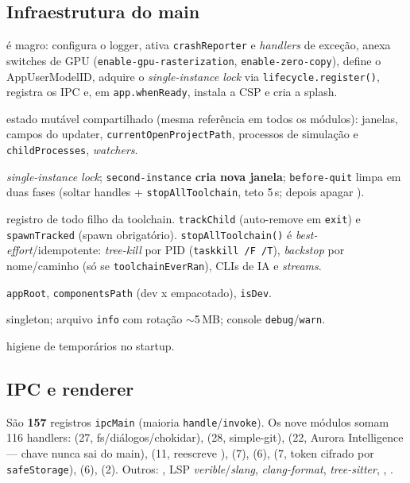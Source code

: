 \subsection{Infraestrutura do main}
 é magro: configura o logger, ativa \lstinline|crashReporter| e \emph{handlers} de exceção, anexa switches de GPU (\lstinline|enable-gpu-rasterization|, \lstinline|enable-zero-copy|), define o AppUserModelID, adquire o \emph{single-instance lock} via \lstinline|lifecycle.register()|, registra os IPC e, em \lstinline|app.whenReady|, instala a CSP e cria a splash.

\begin{description}[leftmargin=*]
  \item[\file{state.js}] estado mutável compartilhado (mesma referência em todos os módulos): janelas, campos do updater, \lstinline|currentOpenProjectPath|, processos de simulação e \lstinline|childProcesses|, \emph{watchers}.
  \item[\file{lifecycle.js}] \emph{single-instance lock}; \lstinline|second-instance| \textbf{cria nova janela}; \lstinline|before-quit| limpa em duas fases (soltar handles + \lstinline|stopAllToolchain|, teto 5\,s; depois apagar ).
  \item[\file{process\_registry.js}] registro de todo filho da toolchain. \lstinline|trackChild| (auto-remove em \lstinline|exit|) e \lstinline|spawnTracked| (spawn obrigatório). \lstinline|stopAllToolchain()| é \emph{best-effort}/idempotente: \emph{tree-kill} por PID (\lstinline|taskkill /F /T|), \emph{backstop} por nome/caminho (só se \lstinline|toolchainEverRan|), CLIs de IA e \emph{streams}.
  \item[\file{paths.js}] \lstinline|appRoot|, \lstinline|componentsPath| (dev x empacotado), \lstinline|isDev|.
  \item[\file{logger.js}]  singleton; arquivo \lstinline|info| com rotação $\sim$5\,MB; console \lstinline|debug|/\lstinline|warn|.
  \item[\file{temp\_gc.js}] higiene de temporários no startup.
\end{description}

\subsection{IPC e renderer}
São \textbf{157} registros \lstinline|ipcMain| (maioria \lstinline|handle|/\lstinline|invoke|). Os nove módulos  somam 116 handlers:  (27, fs/diálogos/chokidar),  (28, simple-git),  (22, Aurora Intelligence --- chave nunca sai do main),  (11, reescreve ),  (7),  (6),  (7, token cifrado por \lstinline|safeStorage|),  (6),  (2). Outros: , LSP \emph{verible}/\emph{slang}, \emph{clang-format}, \emph{tree-sitter}, , .

